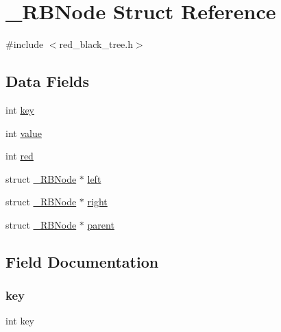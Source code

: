 \hypertarget{struct___r_b_node}{}\section{\+\_\+\+R\+B\+Node Struct Reference}
\label{struct___r_b_node}


{\ttfamily \#include $<$red\+\_\+black\+\_\+tree.\+h$>$}

\subsection*{Data Fields}
\begin{DoxyCompactItemize}
\item 
int \hyperlink{struct___r_b_node_a35af0be900467fedbb610bd6ea65ed78}{key}
\item 
int \hyperlink{struct___r_b_node_ac4f474c82e82cbb89ca7c36dd52be0ed}{value}
\item 
int \hyperlink{struct___r_b_node_a6761340706096510fd89edca40a63b9b}{red}
\item 
struct \hyperlink{struct___r_b_node}{\+\_\+\+R\+B\+Node} $\ast$ \hyperlink{struct___r_b_node_a66260df867ad376531d9938c1576ef21}{left}
\item 
struct \hyperlink{struct___r_b_node}{\+\_\+\+R\+B\+Node} $\ast$ \hyperlink{struct___r_b_node_ad44dabcb80eb4e2671365ebc9d6b2798}{right}
\item 
struct \hyperlink{struct___r_b_node}{\+\_\+\+R\+B\+Node} $\ast$ \hyperlink{struct___r_b_node_a9788bfc94d2d8984d7e40d8a22305b74}{parent}
\end{DoxyCompactItemize}


\subsection{Field Documentation}
\mbox{\label{struct___r_b_node_a35af0be900467fedbb610bd6ea65ed78}} 
\subsubsection{\texorpdfstring{key}{key}}
{\footnotesize\ttfamily int key}

\mbox{\label{struct___r_b_node_a66260df867ad376531d9938c1576ef21}} 
